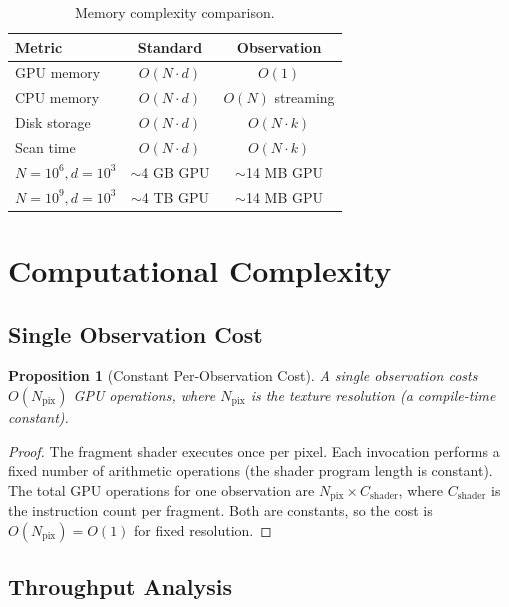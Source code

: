 \documentclass[11pt,twocolumn,a4paper]{article}
\newtheorem{proposition}[theorem]{Proposition}
\theoremstyle{definition}
\theoremstyle{remark}
\newcommand{\Npix}{N_{\mathrm{pix}}}
\begin{document}
\begin{table}[H]
\centering
\caption{Memory complexity comparison.}
\label{tab:memory_comparison}
\begin{tabular}{@{}lcc@{}}
\toprule
\textbf{Metric} & \textbf{Standard} & \textbf{Observation} \\
\midrule
GPU memory & $O(N \cdot d)$ & $O(1)$ \\
CPU memory & $O(N \cdot d)$ & $O(N)$ streaming \\
Disk storage & $O(N \cdot d)$ & $O(N \cdot k)$ \\
Scan time & $O(N \cdot d)$ & $O(N \cdot k)$ \\
$N = 10^6, d = 10^3$ & $\sim$4 GB GPU & $\sim$14 MB GPU \\
$N = 10^9, d = 10^3$ & $\sim$4 TB GPU & $\sim$14 MB GPU \\
\bottomrule
\end{tabular}
\end{table}


\section{Computational Complexity}
\label{sec:computational_complexity}

\subsection{Single Observation Cost}

\begin{proposition}[Constant Per-Observation Cost]
\label{prop:obs_cost}
A single observation costs $O(\Npix)$ GPU operations, where $\Npix$ is the texture resolution (a compile-time constant).
\end{proposition}

\begin{proof}
The fragment shader executes once per pixel. Each invocation performs a fixed number of arithmetic operations (the shader program length is constant). The total GPU operations for one observation are $\Npix \times C_{\mathrm{shader}}$, where $C_{\mathrm{shader}}$ is the instruction count per fragment. Both are constants, so the cost is $O(\Npix) = O(1)$ for fixed resolution.
\end{proof}

\subsection{Throughput Analysis}
\end{document}
